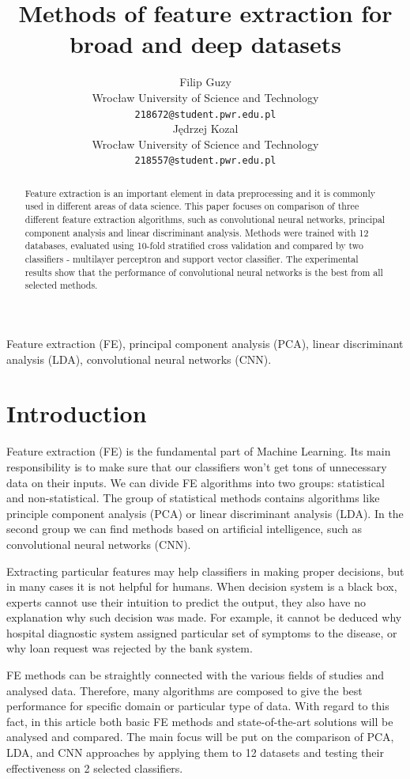 \documentclass[a4paper, 10 pt, journal]{ieeeconf}
\title{\LARGE \bf
Methods of feature extraction for broad and deep datasets
}
\author{ \parbox{2 in}{\centering Filip Guzy \\
        Wrocław University of Science and Technology\\
        {\tt\small 218672@student.pwr.edu.pl}}
        \hspace*{ 0.3 in}
        \parbox{2 in}{\centering Jędrzej Kozal \\
        Wrocław University of Science and Technology\\
        {\tt\small 218557@student.pwr.edu.pl}}
}
\begin{document}
\maketitle
\thispagestyle{empty}
\pagestyle{empty}

\begin{abstract}
Feature extraction is an important element in data preprocessing and it is commonly used in different areas of data science. This paper focuses on comparison of three different feature extraction algorithms, such as convolutional neural networks, principal component analysis and linear discriminant analysis. Methods were trained with 12 databases, evaluated using 10-fold stratified cross validation and compared by two classifiers - multilayer perceptron and support vector classifier. The experimental results show that the performance of convolutional neural networks is the best from all selected methods.
\end{abstract}

\begin{keywords}
Feature extraction (FE), principal component analysis (PCA), linear discriminant analysis (LDA), convolutional neural networks (CNN).
\end{keywords}

\section{Introduction}

Feature extraction (FE) is the fundamental part of Machine Learning. Its main responsibility is to make sure that our classifiers won't get tons of unnecessary data on their inputs. We can divide FE algorithms into two groups: statistical and non-statistical. The group of statistical methods contains algorithms like principle component analysis (PCA) or linear discriminant analysis (LDA). In the second group we can find methods based on artificial intelligence, such as convolutional neural networks (CNN). 

Extracting particular features may help classifiers in making proper decisions, but in many cases it is not helpful for humans. When decision system is a black box, experts cannot use their intuition to predict the output, they also have no explanation why such decision was made. For example, it cannot be deduced why hospital diagnostic system assigned particular set of symptoms to the disease, or why loan request was rejected by the bank system.

FE methods can be straightly connected with the various fields of studies and analysed data. Therefore, many algorithms are composed to give the best performance for specific domain or particular type of data. With regard to this fact, in this article both basic FE methods and state-of-the-art solutions will be analysed and compared. The main focus will be put on the comparison of PCA, LDA, and CNN approaches by applying them to 12 datasets and testing their effectiveness on 2 selected classifiers.
\end{document}
